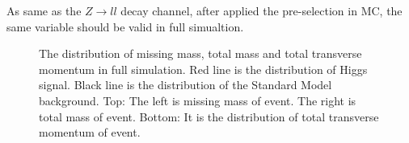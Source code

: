 \documentclass[11pt,a4paper]{cepcnote}
\begin{document}
As same as the $Z\to ll$ decay channel, after applied the pre-selection in MC, the same variable should be valid 
in full simualtion.
\begin{figure}[H]
	\centering
	\caption[]{The distribution of missing mass, total mass and total transverse momentum in full simulation. 
	Red line is the distribution of Higgs signal. Black line is the distribution of the Standard Model background.
	Top: The left is missing mass of event. The right is total mass of event.
	Bottom: It is the distribution of total transverse momentum of event.}
	\label{fig:nnHfiltered}
\end{figure}
\end{document}
